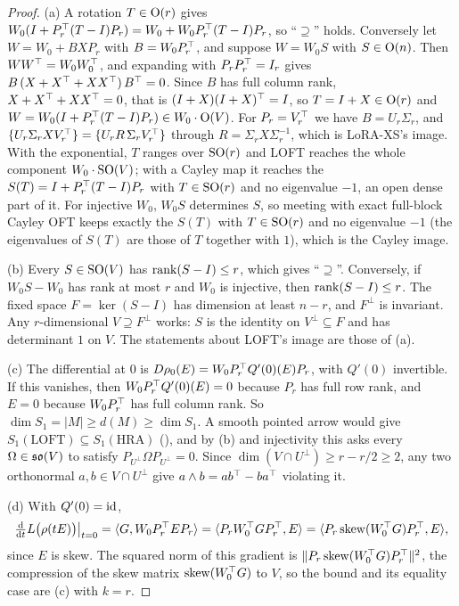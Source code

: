 \begin{proof}
(a) A rotation $T\in\mathrm{O}(r)$ gives $W_0(I+P_r^{\top}(T-I)P_r)=W_0+W_0P_r^{\top}(T-I)P_r$, so ``$\supseteq$'' holds. Conversely let
$W=W_0+BXP_r$ with $B=W_0P_r^{\top}$, and suppose $W=W_0S$ with $S\in\mathrm{O}(n)$. Then $WW^{\top}=W_0W_0^{\top}$, and expanding with
$P_rP_r^{\top}=I_r$ gives $B\,(X+X^{\top}+XX^{\top})\,B^{\top}=0$. Since $B$ has full column rank, $X+X^{\top}+XX^{\top}=0$, that is
$(I+X)(I+X)^{\top}=I$, so $T=I+X\in\mathrm{O}(r)$ and $W=W_0(I+P_r^{\top}(T-I)P_r)\in W_0\cdot\mathrm{O}(V)$. For $P_r=V_r^{\top}$ we have
$B=U_r\Sigma_r$, and $\{U_r\Sigma_rXV_r^{\top}\}=\{U_rR\,\Sigma_rV_r^{\top}\}$ through $R=\Sigma_rX\Sigma_r^{-1}$, which is
LoRA-XS's image. With the exponential, $T$ ranges over $\mathrm{SO}(r)$ and LOFT reaches the whole component $W_0\cdot\mathrm{SO}(V)$;
with a Cayley map it reaches the $S(T)=I+P_r^{\top}(T-I)P_r$ with $T\in\mathrm{SO}(r)$ and no eigenvalue $-1$, an open dense part of
it. For injective $W_0$, $W_0S$ determines $S$, so meeting with exact full-block Cayley OFT keeps exactly the $S(T)$ with
$T\in\mathrm{SO}(r)$ and no eigenvalue $-1$ (the eigenvalues of $S(T)$ are those of $T$ together with $1$), which is the Cayley
image.

(b) Every $S\in\mathrm{SO}(V)$ has $\operatorname{rank}(S-I)\le r$, which gives ``$\supseteq$''. Conversely, if $W_0S-W_0$ has rank at most $r$
and $W_0$ is injective, then $\operatorname{rank}(S-I)\le r$. The fixed space $F=\ker(S-I)$ has dimension at least $n-r$, and $F^\perp$
is invariant. Any $r$-dimensional $V\supseteq F^\perp$ works: $S$ is the identity on $V^\perp\subseteq F$ and has
determinant $1$ on $V$. The statements about LOFT's image are those of (a).

(c) The differential at $0$ is $D\rho_0(E)=W_0P_r^{\top} Q'(0)(E)P_r$, with $Q'(0)$ invertible. If this vanishes, then $W_0P_r^{\top} Q'(0)(E)=0$ because $P_r$
has full row rank, and $E=0$ because $W_0P_r^{\top}$ has full column rank. So $\dim S_1=\lvert M\rvert\ge d(M)\ge\dim S_1$. A
smooth pointed arrow would give $S_1(\mathrm{LOFT})\subseteq S_1(\mathrm{HRA})$ (), and by
(b) and injectivity this asks every $\Omega\in\mathfrak{so}(V)$ to satisfy $P_{U^\perp}\Omega P_{U^\perp}=0$.
Since $\dim(V\cap U^\perp)\ge r-r/2\ge2$, any two orthonormal $a,b\in V\cap U^\perp$ give $a\wedge b=ab^{\top}-ba^{\top}$
violating it.

(d) With $Q'(0)=\mathrm{id}$,
\begin{equation*}
  \tfrac{\mathrm{d}}{\mathrm{d} t}L\big(\rho(tE)\big)\big|_{t=0}=\langle G,W_0P_r^{\top} EP_r\rangle=\langle P_rW_0^{\top} GP_r^{\top},E\rangle
  =\langle P_r\operatorname{skew}(W_0^{\top} G)P_r^{\top},E\rangle,
\end{equation*}
since $E$ is skew. The squared norm of this gradient is $\lVert P_r\operatorname{skew}(W_0^{\top} G)P_r^{\top}\rVert^2$, the compression of the
skew matrix $\operatorname{skew}(W_0^{\top} G)$ to $V$, so the bound and its equality case are (c) with $k=r$.
\end{proof}

